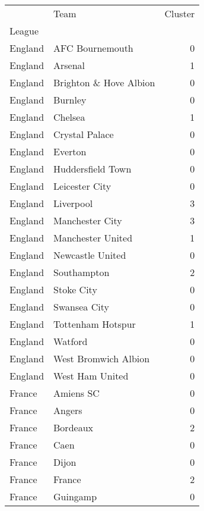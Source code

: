 \begin{tabular}{llr}
\toprule
{} &                      Team &  Cluster \\
League  &                           &          \\
\midrule
England &           AFC Bournemouth &        0 \\
England &                   Arsenal &        1 \\
England &    Brighton \& Hove Albion &        0 \\
England &                   Burnley &        0 \\
England &                   Chelsea &        1 \\
England &            Crystal Palace &        0 \\
England &                   Everton &        0 \\
England &         Huddersfield Town &        0 \\
England &            Leicester City &        0 \\
England &                 Liverpool &        3 \\
England &           Manchester City &        3 \\
England &         Manchester United &        1 \\
England &          Newcastle United &        0 \\
England &               Southampton &        2 \\
England &                Stoke City &        0 \\
England &              Swansea City &        0 \\
England &         Tottenham Hotspur &        1 \\
England &                   Watford &        0 \\
England &      West Bromwich Albion &        0 \\
England &           West Ham United &        0 \\
France  &                 Amiens SC &        0 \\
France  &                    Angers &        0 \\
France  &                  Bordeaux &        2 \\
France  &                      Caen &        0 \\
France  &                     Dijon &        0 \\
France  &                    France &        2 \\
France  &                  Guingamp &        0 \\

\end{tabular}
